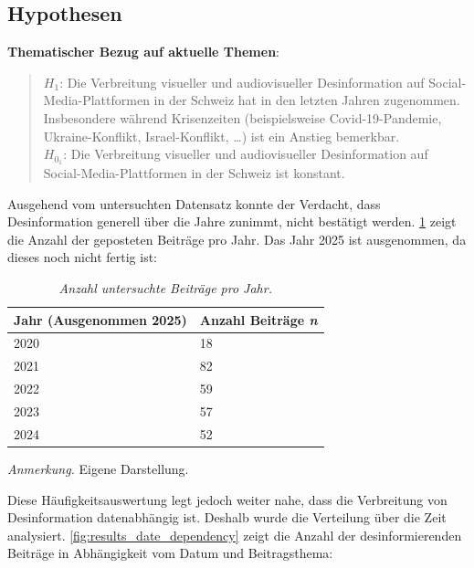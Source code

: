 \documentclass[12pt,a4paper]{article}        %
\begin{document}
\subsection{Hypothesen}
\textbf{Thematischer Bezug auf aktuelle Themen}:
\begin{quote}
  \(H_1\): Die Verbreitung visueller und audiovisueller Desinformation auf Social-Media-Plattformen in der Schweiz hat in den letzten Jahren zugenommen. Insbesondere während Krisenzeiten (beispielsweise Covid-19-Pandemie, Ukraine-Konflikt, Israel-Konflikt, …) ist ein Anstieg bemerkbar.\\
  \(H_{0_1}\): Die Verbreitung visueller und audiovisueller Desinformation auf Social-Media-Plattformen in der Schweiz ist konstant.
\end{quote}
Ausgehend vom untersuchten Datensatz konnte der Verdacht, dass Desinformation generell über die Jahre zunimmt, nicht bestätigt werden. \ref{tab:results_posts_per_year} zeigt die Anzahl der geposteten Beiträge pro Jahr. Das Jahr 2025 ist ausgenommen, da dieses noch nicht fertig ist:
\begin{table}[H]
  \caption{\textit{Anzahl untersuchte Beiträge pro Jahr.}}
  \label{tab:results_posts_per_year}
  \centering
  \begin{tabular}{|l|l|} \hline
    \textbf{Jahr} (Ausgenommen 2025) & \textbf{Anzahl Beiträge \textit{n}}\\ \hline
    2020& 18\\ \hline
    2021& 82\\ \hline
    2022& 59\\ \hline
    2023&57\\\hline
    2024&52\\\hline
  \end{tabular}
\footnotesize\textit{Anmerkung.} Eigene Darstellung.
\end{table}
Diese Häufigkeitsauswertung legt jedoch weiter nahe, dass die Verbreitung von Desinformation datenabhängig ist. Deshalb wurde die Verteilung über die Zeit analysiert. \ref{fig:results_date_dependency} zeigt die Anzahl der desinformierenden Beiträge in Abhängigkeit vom Datum und Beitragsthema:
\end{document}
